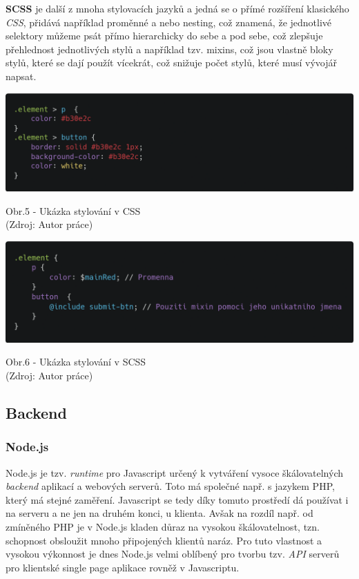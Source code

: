 \documentclass[12pt,a4paper]{report}
\begin{document}
  \textbf{SCSS} je další z mnoha stylovacích jazyků a jedná se o přímé rozšíření klasického \emph{CSS}, přidává
  například proměnné a nebo nesting, což znamená, že jednotlivé selektory můžeme psát přímo
  hierarchicky do sebe a pod sebe, což zlepšuje přehlednost jednotlivých stylů a například tzv.
  mixins, což jsou vlastně bloky stylů, které se dají použít vícekrát, což snižuje počet stylů, které musí
  vývojář napsat.
  
  \vspace*{0.5cm}
  \noindent\includegraphics[width=\linewidth]{cssCodeblock.png}
  \begin{center}
    Obr.5 - Ukázka stylování v CSS  \\
    (Zdroj: Autor práce)
  \end{center}

  \vspace*{0.5cm}\vspace*{0.5cm}
  \noindent\includegraphics[width=\linewidth]{scssCodeblock.png}
  \begin{center}
    Obr.6 -  Ukázka stylování v SCSS  \\
    (Zdroj: Autor práce)
  \end{center}
  \vspace*{0.5cm}

  \subsection{Backend}
  \subsubsection{Node.js}
  Node.js je tzv. \emph{runtime} pro Javascript určený k vytváření vysoce škálovatelných \emph{backend} aplikací a
  webových serverů. Toto má společné např. s jazykem PHP, který má stejné zaměření. Javascript se
  tedy díky tomuto prostředí dá používat i na serveru a ne jen na druhém konci, u klienta. Avšak na
  rozdíl např. od zmíněného PHP je v Node.js kladen důraz na vysokou škálovatelnost, tzn.
  schopnost obsloužit mnoho připojených klientů naráz. Pro tuto vlastnost a vysokou výkonnost je
  dnes Node.js velmi oblíbený pro tvorbu tzv. \emph{API} serverů pro klientské single page aplikace rovněž v
  Javascriptu. 
\end{document}
